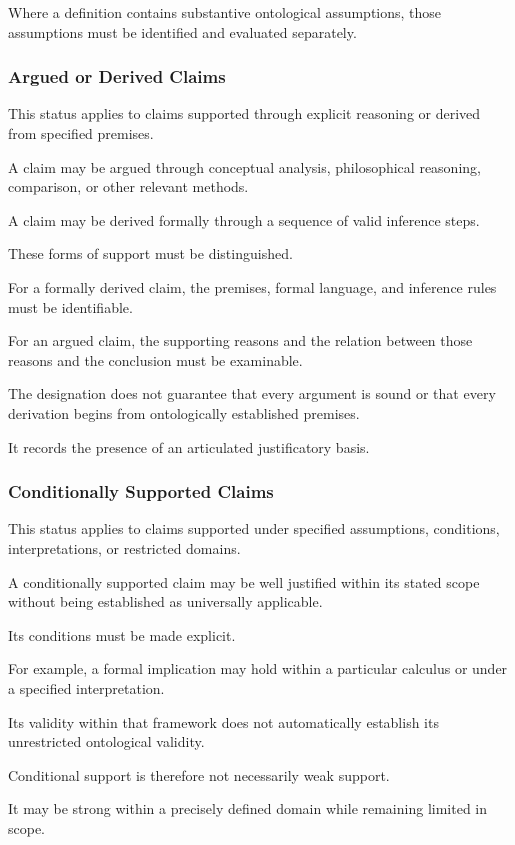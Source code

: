Where a definition
contains substantive
ontological assumptions,
those assumptions
must be identified
and evaluated
separately.

\subsubsection{Argued or Derived Claims}

This status applies
to claims supported
through explicit
reasoning or
derived from
specified premises.

A claim may
be argued through
conceptual analysis,
philosophical reasoning,
comparison, or
other relevant
methods.

A claim may
be derived formally
through a sequence
of valid inference
steps.

These forms
of support must
be distinguished.

For a formally
derived claim,
the premises,
formal language,
and inference
rules must be
identifiable.

For an argued
claim, the
supporting reasons
and the relation
between those
reasons and
the conclusion
must be examinable.

The designation
does not guarantee
that every argument
is sound or
that every derivation
begins from
ontologically
established premises.

It records the
presence of
an articulated
justificatory basis.

\subsubsection{Conditionally Supported Claims}

This status applies
to claims supported
under specified
assumptions, conditions,
interpretations, or
restricted domains.

A conditionally
supported claim
may be well
justified within
its stated scope
without being
established as
universally applicable.

Its conditions
must be made
explicit.

For example,
a formal implication
may hold within
a particular
calculus or
under a specified
interpretation.

Its validity
within that
framework does
not automatically
establish its
unrestricted
ontological validity.

Conditional support
is therefore
not necessarily
weak support.

It may be
strong within
a precisely
defined domain
while remaining
limited in
scope.

